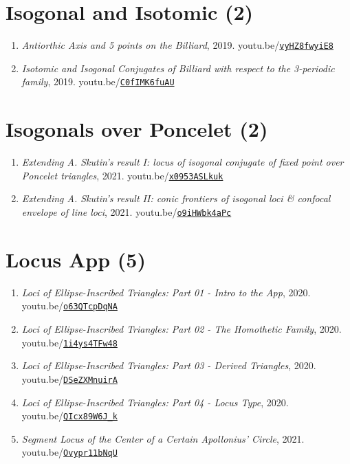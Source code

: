 \documentclass[12pt]{article}
\begin{document}
\section{Isogonal and Isotomic (2)}

\begin{enumerate}[resume]
\item \textit{Antiorthic Axis and 5 points on the Billiard}, 2019. youtu.be/\href{https://youtu.be/vyHZ8fwyiE8}{\nolinkurl{vyHZ8fwyiE8}}
\item \textit{Isotomic and Isogonal Conjugates of Billiard with respect to the 3-periodic family}, 2019. youtu.be/\href{https://youtu.be/C0fIMK6fuAU}{\nolinkurl{C0fIMK6fuAU}}
\end{enumerate}

\section{Isogonals over Poncelet (2)}

\begin{enumerate}[resume]
\item \textit{Extending A. Skutin's result I: locus of isogonal conjugate of fixed point over Poncelet triangles}, 2021. youtu.be/\href{https://youtu.be/x0953ASLkuk}{\nolinkurl{x0953ASLkuk}}
\item \textit{Extending A. Skutin's result II: conic frontiers of isogonal loci \& confocal envelope of line loci}, 2021. youtu.be/\href{https://youtu.be/o9iHWbk4aPc}{\nolinkurl{o9iHWbk4aPc}}
\end{enumerate}

\section{Locus App (5)}

\begin{enumerate}[resume]
\item \textit{Loci of Ellipse-Inscribed Triangles: Part 01 - Intro to the App}, 2020. youtu.be/\href{https://youtu.be/o63QTcpDqNA}{\nolinkurl{o63QTcpDqNA}}
\item \textit{Loci of Ellipse-Inscribed Triangles: Part 02 - The Homothetic Family}, 2020. youtu.be/\href{https://youtu.be/1i4ys4TFw48}{\nolinkurl{1i4ys4TFw48}}
\item \textit{Loci of Ellipse-Inscribed Triangles: Part 03 - Derived Triangles}, 2020. youtu.be/\href{https://youtu.be/DSeZXMnuirA}{\nolinkurl{DSeZXMnuirA}}
\item \textit{Loci of Ellipse-Inscribed Triangles: Part 04 - Locus Type}, 2020. youtu.be/\href{https://youtu.be/QIcx89W6J_k}{\nolinkurl{QIcx89W6J\_k}}
\item \textit{Segment Locus of the Center of a Certain Apollonius' Circle}, 2021. youtu.be/\href{https://youtu.be/Ovypr11bNqU}{\nolinkurl{Ovypr11bNqU}}
\end{enumerate}
\end{document}
